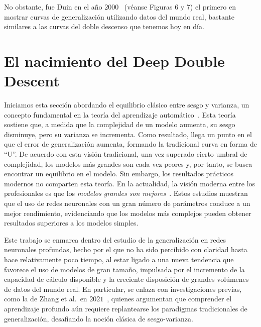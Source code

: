 No obstante, fue Duin en el año $2000$~\cite{Duin2000} (véanse Figuras 6 y 7) el primero en mostrar curvas de generalización utilizando datos del mundo real, bastante similares a las curvas del doble descenso que tenemos hoy en día.\newline

\section{El nacimiento del Deep Double Descent}\label{}

Iniciamos esta sección abordando el equilibrio clásico entre sesgo y varianza, un concepto fundamental en la teoría del aprendizaje automático~\cite{Geman1992, Hastie2001, Bengio2010}. Esta teoría sostiene que, a medida que la complejidad de un modelo aumenta, su sesgo disminuye, pero su varianza se incrementa. Como resultado, llega un punto en el que el error de generalización aumenta, formando la tradicional curva en forma de ``U''. De acuerdo con esta visión tradicional, una vez superado cierto umbral de complejidad, los modelos más grandes son cada vez peores y, por tanto, se busca encontrar un equilibrio en el modelo. Sin embargo, los resultados prácticos modernos no comparten esta teoría. En la actualidad, la visión moderna entre los profesionales es que los \emph{modelos grandes son mejores}~\cite{Krizhevsky2012, Neal2019, Huang2019, Szegedy2014}. Estos estudios muestran que el uso de redes neuronales con un gran número de parámetros conduce a un mejor rendimiento, evidenciando que los modelos más complejos pueden obtener resultados superiores a los modelos simples.\newline

Este trabajo se enmarca dentro del estudio de la generalización en redes neuronales profundas, hecho por el que no ha sido percibido con claridad hasta hace relativamente poco tiempo, al estar ligado a una nueva tendencia que favorece el uso de modelos de gran tamaño, impulsada por el incremento de la capacidad de cálculo disponible y la creciente disposición de grandes volúmenes de datos del mundo real. En particular, se enlaza con investigaciones previas, como la de Zhang et al.\ en $2021$~\cite{Zhang2021}, quienes argumentan que comprender el aprendizaje profundo aún requiere replantearse los paradigmas tradicionales de generalización, desafiando la noción clásica de sesgo-varianza.\newline

